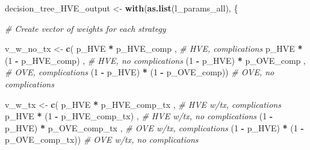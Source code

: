 \documentclass[
]{article}
\newenvironment{Shaded}{\begin{snugshade}}{\end{snugshade}}
\newcommand{\CommentTok}[1]{\textcolor[rgb]{0.56,0.35,0.01}{\textit{#1}}}
\newcommand{\DecValTok}[1]{\textcolor[rgb]{0.00,0.00,0.81}{#1}}
\newcommand{\KeywordTok}[1]{\textcolor[rgb]{0.13,0.29,0.53}{\textbf{#1}}}
\newcommand{\NormalTok}[1]{#1}
\newcommand{\OperatorTok}[1]{\textcolor[rgb]{0.81,0.36,0.00}{\textbf{#1}}}
\newcommand{\StringTok}[1]{\textcolor[rgb]{0.31,0.60,0.02}{#1}}
\begin{document}
\begin{Shaded}
\begin{Highlighting}[]
\NormalTok{decision_tree_HVE_output <-}\StringTok{ }\KeywordTok{with}\NormalTok{(}\KeywordTok{as.list}\NormalTok{(l_params_all), \{}
  
  \CommentTok{# Create vector of weights for each strategy }
  
\NormalTok{  v_w_no_tx  <-}\StringTok{ }\KeywordTok{c}\NormalTok{(    p_HVE  }\OperatorTok{*}\StringTok{      }\NormalTok{p_HVE_comp     ,  }\CommentTok{# HVE, complications}
\NormalTok{                      p_HVE  }\OperatorTok{*}\StringTok{ }\NormalTok{(}\DecValTok{1} \OperatorTok{-}\StringTok{ }\NormalTok{p_HVE_comp)    ,  }\CommentTok{# HVE, no complications}
\NormalTok{                 (}\DecValTok{1} \OperatorTok{-}\StringTok{ }\NormalTok{p_HVE) }\OperatorTok{*}\StringTok{    }\NormalTok{p_OVE_comp       ,  }\CommentTok{# OVE, complications}
\NormalTok{                 (}\DecValTok{1} \OperatorTok{-}\StringTok{ }\NormalTok{p_HVE) }\OperatorTok{*}\StringTok{ }\NormalTok{(}\DecValTok{1} \OperatorTok{-}\StringTok{ }\NormalTok{p_OVE_comp))      }\CommentTok{# OVE, no complications}
  
\NormalTok{  v_w_tx     <-}\StringTok{ }\KeywordTok{c}\NormalTok{(    p_HVE  }\OperatorTok{*}\StringTok{      }\NormalTok{p_HVE_comp_tx  ,  }\CommentTok{# HVE w/tx, complications}
\NormalTok{                      p_HVE  }\OperatorTok{*}\StringTok{ }\NormalTok{(}\DecValTok{1} \OperatorTok{-}\StringTok{ }\NormalTok{p_HVE_comp_tx) ,  }\CommentTok{# HVE w/tx, no complications}
\NormalTok{                 (}\DecValTok{1} \OperatorTok{-}\StringTok{ }\NormalTok{p_HVE) }\OperatorTok{*}\StringTok{      }\NormalTok{p_OVE_comp_tx  ,  }\CommentTok{# OVE w/tx, complications}
\NormalTok{                 (}\DecValTok{1} \OperatorTok{-}\StringTok{ }\NormalTok{p_HVE) }\OperatorTok{*}\StringTok{ }\NormalTok{(}\DecValTok{1} \OperatorTok{-}\StringTok{ }\NormalTok{p_OVE_comp_tx))   }\CommentTok{# OVE w/tx, no complications}
  

\end{Highlighting}
\end{Shaded}
\end{document}
